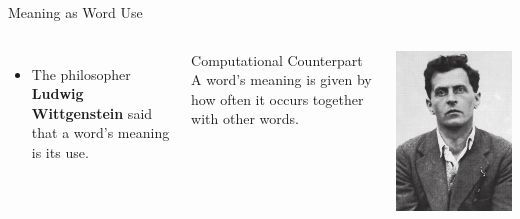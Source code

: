 \documentclass[professionalfonts, xcolor={usenames,svgnames,x11names,table}]{beamer}
\begin{document}
\begin{frame}{Meaning as Word Use}
    \begin{columns}
        \begin{itemize}
            \item The philosopher \textbf{Ludwig Wittgenstein} said that a word's meaning is its use.
        \end{itemize}
        \begin{block}{Computational Counterpart}
            A word's meaning is given by how often it occurs together with other words.
        \end{block}
        
        \centering
        \includegraphics[width=1\linewidth]{./img/wittgenstein}
    \end{columns}
\end{frame}
\end{document}
